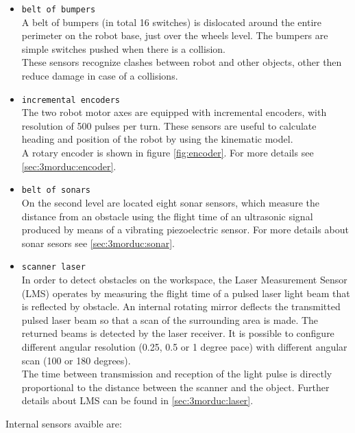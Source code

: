 \begin{itemize}
\item \texttt{belt of bumpers} \\
  A belt of bumpers (in total 16 switches) is dislocated around
  the entire perimeter on the robot base, just over the wheels level.
  The bumpers are simple switches pushed when there is a collision.
  \\
  These sensors recognize clashes between robot and other objects,
  other then reduce damage in case of a collisions.

\item \texttt{incremental encoders} \\
 The two robot motor axes are equipped with incremental encoders, with
 resolution of 500 pulses per turn. These sensors are useful to calculate
 heading and position of the robot by using the kinematic model.  
 \\
 A rotary encoder is shown in figure \ref{fig:encoder}. For more details
 see \ref{sec:3morduc:encoder}.

\item \texttt{belt of sonars} \\
  On the second level are located eight sonar sensors, which measure the
  distance from an obstacle using the flight time of an ultrasonic signal
  produced by means of a vibrating piezoelectric sensor. 
  For more details about sonar sesors see \ref{sec:3morduc:sonar}.

\item \texttt{scanner laser} \\
  In order to detect obstacles on the workspace, the Laser Measurement
  Sensor (LMS) operates by measuring the flight time of a pulsed laser
  light beam that is reflected by obstacle. An internal rotating mirror
  deflects the transmitted pulsed laser beam so that a scan of the
  surrounding area is made. The returned beams is detected by the laser
  receiver. It is possible to configure different angular resolution
  (0.25, 0.5 or 1 degree pace) with different angular scan (100 or 180
  degrees).
  \\
  The time between transmission and reception of the light pulse is directly
  proportional to the distance between the scanner and the object. 
  Further details about LMS can be found in \ref{sec:3morduc:laser}.

\end{itemize}

Internal sensors avaible are:



